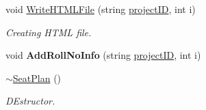 \begin{DoxyCompactItemize}
\item 
void \hyperlink{classSeatPlan_a67c10e2277f1f2823581cddf4df373c5}{Write\-H\-T\-M\-L\-File} (string \hyperlink{classReadInput_a3ad470a25b3e0a29466bf4ff1f7d8e81}{project\-I\-D}, int i)
\begin{DoxyCompactList}\small\item\em Creating H\-T\-M\-L file. \end{DoxyCompactList}\item 
\hypertarget{classSeatPlan_a3257eb25ac9c82d2757d2a7144614762}{void {\bfseries Add\-Roll\-No\-Info} (string \hyperlink{classReadInput_a3ad470a25b3e0a29466bf4ff1f7d8e81}{project\-I\-D}, int i)}\label{classSeatPlan_a3257eb25ac9c82d2757d2a7144614762}

\item 
\hyperlink{classSeatPlan_a373a1d60b6617a2e424f7d2f8866ec2e}{$\sim$\-Seat\-Plan} ()
\begin{DoxyCompactList}\small\item\em D\-Estructor. \end{DoxyCompactList}\end{DoxyCompactItemize}
